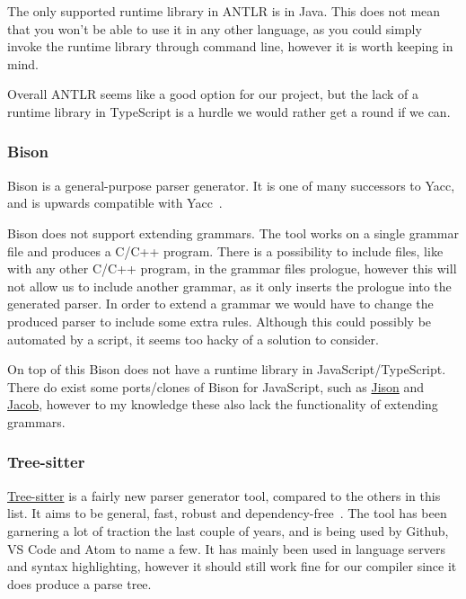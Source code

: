 The only supported runtime library in ANTLR is in Java.
This does not mean that you won't be able to use it in any other language, as you could simply invoke the runtime library through command line, however it is worth keeping in mind.

Overall ANTLR seems like a good option for our project, but the lack of a runtime library in TypeScript is a hurdle we would rather get a round if we can.

\subsubsection{Bison}\label{subsubsec:bison}

Bison is a general-purpose parser generator.
It is one of many successors to Yacc, and is upwards compatible with Yacc~\cite{bison}.

Bison does not support extending grammars.
The tool works on a single grammar file and produces a C/C++ program.
There is a possibility to include files, like with any other C/C++ program, in the grammar files prologue, however this will not allow us to include another grammar, as it only inserts the prologue into the generated parser.
In order to extend a grammar we would have to change the produced parser to include some extra rules.
Although this could possibly be automated by a script, it seems too hacky of a solution to consider.

On top of this Bison does not have a runtime library in JavaScript/TypeScript.
There do exist some ports/clones of Bison for JavaScript, such as \href{http://zaa.ch/jison/}{Jison} and \href{http://canna71.github.io/Jacob/}{Jacob}, however to my knowledge these also lack the functionality of extending grammars.

\subsubsection{Tree-sitter}\label{subsubsec:tree-sitter}

\href{https://tree-sitter.github.io/tree-sitter/}{Tree-sitter} is a fairly new parser generator tool, compared to the others in this list.
It aims to be general, fast, robust and dependency-free~\cite{tree-sitter}.
The tool has been garnering a lot of traction the last couple of years, and is being used by Github, VS Code and Atom to name a few.
It has mainly been used in language servers and syntax highlighting, however it should still work fine for our compiler since it does produce a parse tree.

